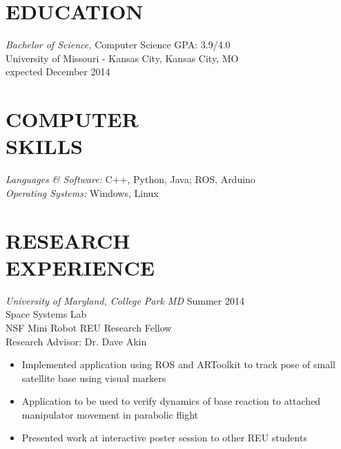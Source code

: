 \documentclass[line,margin]{res}
\begin{document}
\address{\hfill (913)235-1070 \textbar \textbar \hspace{1 mm}  victoria.chen.wu@gmail.com \textbar \textbar \hspace{1 mm} vptarmigan.wordpress.com} 

 
\begin{resume}
 
\section{EDUCATION} {\sl Bachelor of Science,} Computer Science	\hfill GPA: 3.9/4.0\\
                University of Missouri - Kansas City, Kansas City, MO \\
                expected December 2014 
\section{COMPUTER \\ SKILLS} {\sl Languages \& Software:} 
		C++, Python, Java; ROS, Arduino \\
                {\sl Operating Systems:} Windows, Linux 
\section {RESEARCH \\ EXPERIENCE}
		{\sl University of Maryland, College Park MD}  \hfill  Summer 2014\\
		Space Systems Lab\\
		NSF Mini Robot REU Research Fellow \\
		Research Advisor: Dr. Dave Akin 
                 \begin{itemize}[leftmargin=5mm]  \itemsep -2pt %
		 \item Implemented application using ROS and ARToolkit to track pose of small satellite base using visual markers
		 \item Application to be used to verify dynamics of base reaction to attached manipulator movement in parabolic flight 
		 \item Presented work at interactive poster session to other REU students
         \end{itemize} 
		

\end{resume}
\end{document}
